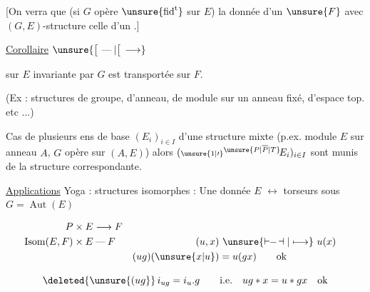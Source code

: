 {\footnotesize [On verra que (si $G$ opère $\unsure{\text{fid}^{\mathrm{t}}}$ sur $E$) la donnée d'un   $\unsure{F}$ avec $(G,E)$-structure  celle d'un  .]}

\uline{Corollaire}  $\unsure{\big[\,\mathbin{\text{---}}|\big[\,\longrightarrow}$ 

sur $E$ invariante par $G$ est transportée sur $F$.

(Ex : structures de groupe, d'anneau, de module sur un anneau fixé, d'espace top. etc ...)

Cas de plusieurs ens de base $(E_i)_{i\in I}$   d'une structure mixte (p.ex. module $E$ sur anneau $A$, $G$ opère sur $(A,E)$) alors $({\scriptstyle\unsure{1|\prime}}{}^{\unsure{P|\overline P|T}}\!E_i)_{i\in I}$ sont munis de la structure correspondante.


\uline{Applications}\quad {} Yoga : structures isomorphes : Une  donnée $E$ $\longleftrightarrow$ torseurs sous $G=\operatorname{Aut}(E)$



\[
\begin{aligned}
P\times E&\longrightarrow F\\
\operatorname{Isom}(E,F)\times E&\mathbin{\text{---}} F
  & (u,x)&\ \unsure{\mathrel{\vdash\!\!-\!\dashv}|\longmapsto}\ u(x)\\
&& (ug)(\unsure{x|u})&=u(gx)\qquad\text{ok}
\end{aligned}
\]


\[
\deleted{\unsure{(ug}}\,i_{ug}=i_u.g\qquad\text{i.e.}\quad ug*x=u*gx\quad\text{ok}
\]

